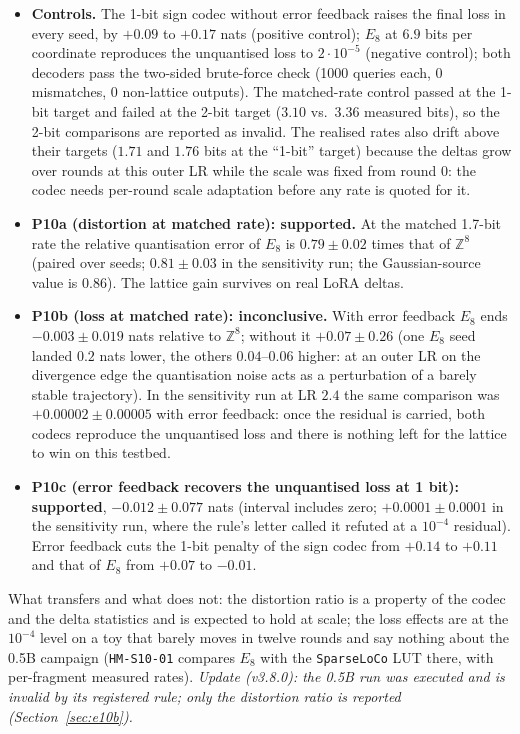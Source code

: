 \documentclass[11pt,a4paper]{article}
\begin{document}
\begin{itemize}[leftmargin=1.8em]
    \item \textbf{Controls.} The 1-bit sign codec without error feedback raises the final loss in every seed, by $+0.09$ to $+0.17$ nats (positive control); $E_8$ at $6.9$ bits per coordinate reproduces the unquantised loss to $2\cdot10^{-5}$ (negative control); both decoders pass the two-sided brute-force check (1000 queries each, 0 mismatches, 0 non-lattice outputs). The matched-rate control passed at the 1-bit target and failed at the 2-bit target ($3.10$ vs.\ $3.36$ measured bits), so the 2-bit comparisons are reported as invalid. The realised rates also drift above their targets ($1.71$ and $1.76$ bits at the ``1-bit'' target) because the deltas grow over rounds at this outer LR while the scale was fixed from round 0: the codec needs per-round scale adaptation before any rate is quoted for it.
    \item \textbf{P10a (distortion at matched rate): supported.} At the matched 1.7-bit rate the relative quantisation error of $E_8$ is $\mathbf{0.79} \pm 0.02$ times that of $\mathbb{Z}^8$ (paired over seeds; $0.81 \pm 0.03$ in the sensitivity run; the Gaussian-source value is $0.86$). The lattice gain survives on real LoRA deltas.
    \item \textbf{P10b (loss at matched rate): inconclusive.} With error feedback $E_8$ ends $-0.003 \pm 0.019$ nats relative to $\mathbb{Z}^8$; without it $+0.07 \pm 0.26$ (one $E_8$ seed landed $0.2$ nats lower, the others $0.04$--$0.06$ higher: at an outer LR on the divergence edge the quantisation noise acts as a perturbation of a barely stable trajectory). In the sensitivity run at LR $2.4$ the same comparison was $+0.00002 \pm 0.00005$ with error feedback: once the residual is carried, both codecs reproduce the unquantised loss and there is nothing left for the lattice to win on this testbed.
    \item \textbf{P10c (error feedback recovers the unquantised loss at 1 bit): supported}, $-0.012 \pm 0.077$ nats (interval includes zero; $+0.0001 \pm 0.0001$ in the sensitivity run, where the rule's letter called it refuted at a $10^{-4}$ residual). Error feedback cuts the 1-bit penalty of the sign codec from $+0.14$ to $+0.11$ and that of $E_8$ from $+0.07$ to $-0.01$.
\end{itemize}
What transfers and what does not: the distortion ratio is a property of the codec and the delta statistics and is expected to hold at scale; the loss effects are at the $10^{-4}$ level on a toy that barely moves in twelve rounds and say nothing about the 0.5B campaign (\texttt{HM-S10-01} compares $E_8$ with the \texttt{SparseLoCo} LUT there, with per-fragment measured rates). \emph{Update (v3.8.0): the 0.5B run was executed and is invalid by its registered rule; only the distortion ratio is reported (Section~\ref{sec:e10b}).}
\end{document}
